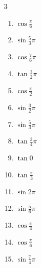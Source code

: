 \begin{multicols}{3}
\begin{enumerate}
  \item $\displaystyle \cos{\frac{\pi}{6}}$

  \item $\displaystyle \sin{\frac{5}{3}\pi}$

  \item $\displaystyle \cos{\frac{7}{6}\pi}$

\columnbreak %

  \item $\displaystyle \tan{\frac{3}{2}\pi}$
        \phantom{$\displaystyle \quad なし$}

  \item $\displaystyle \cos{\frac{\pi}{2}}$
        \phantom{$\displaystyle =0$}

  \item $\displaystyle \sin{\frac{3}{2}\pi}$
        \phantom{$\displaystyle =-1$}

  \item $\displaystyle \sin{\frac{5}{3}\pi}$

  \item $\displaystyle \tan{\frac{3}{4}\pi}$
        \phantom{$\displaystyle =-1$}

  \item $\displaystyle \tan{0}$
        \phantom{$\displaystyle =0$}

  \item $\displaystyle \tan{\frac{\pi}{3}}$

  \item $\displaystyle \sin{2\pi}$
        \phantom{$\displaystyle =0$}

  \item $\displaystyle \sin{\frac{5}{6}\pi}$

  \item $\displaystyle \cos{\frac{\pi}{4}}$

  \item $\displaystyle \cos{\frac{\pi}{6}}$

  \item $\displaystyle \sin{\frac{7}{4}\pi}$


\end{enumerate}
\end{multicols}
